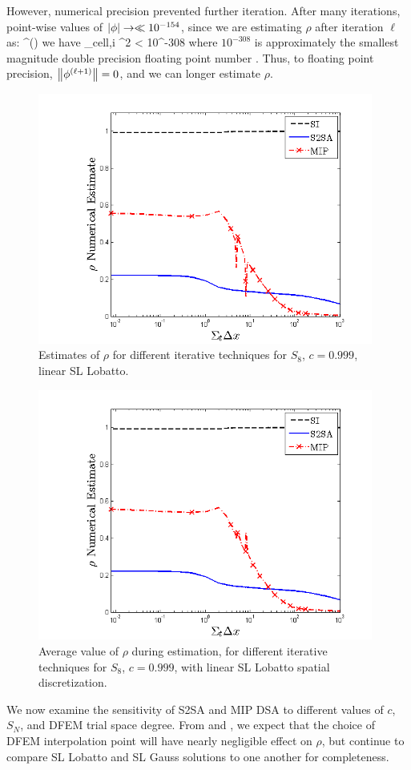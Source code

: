 However, numerical precision prevented further iteration. 
After many iterations, point-wise values of $\left\lvert \phi \right\rvert \to \ll 10^{-154}$, since we are estimating $\rho$ after iteration $\ell$ as:
\benum
\rho^{(\ell)} \approx {} \pec
\eenum 
we have
\benum
\phi_{cell,i} ^2 < 10^{-308} \pec
\eenum
where $10^{-308}$ is approximately the smallest magnitude double precision floating point number
 \cite{numerical_book}. 
Thus, to floating point precision, $\left\lVert \phi^{(\ell+1)} \right\rVert =0$, and we can longer estimate $\rho$. 
\begin{figure}[!htp]
\centering
\includegraphics[width=11cm]{chapter4_acceleration/Const_2_Constant_XS_SN8_P1_Lobatto_Solvers.png}
\caption{Estimates of $\rho$ for different iterative techniques for $S_8$, $c=0.999$, linear SL Lobatto.}
\label{fig:p1_lobatto}
\end{figure}
\begin{figure}[!hbp]
\centering
\includegraphics[width=11cm]{chapter4_acceleration/Const_2_Bar_Constant_XS_SN8_P1_Lobatto_Solvers.png}
\caption{Average value of $\rho$ during estimation, for different iterative techniques for $S_8$, $c=0.999$, with linear SL Lobatto spatial discretization.}
\label{fig:p1_lobatto_bar}
\end{figure}
We now examine the sensitivity of S2SA and MIP DSA to different values of $c$, $S_N$, and DFEM trial space degree.
From  and , we expect that the choice of DFEM interpolation point will have nearly negligible effect on $\rho$, but continue to compare SL Lobatto and SL Gauss solutions to one another for completeness.

